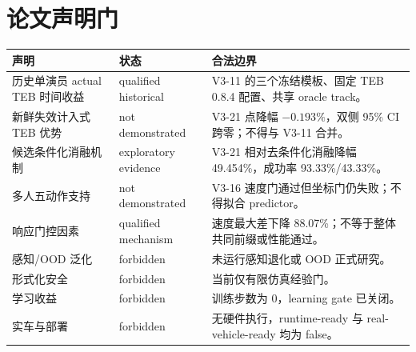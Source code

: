 \documentclass[12pt,a4paper,oneside]{report}
\begin{document}
\chapter{论文声明门}
\begin{longtable}{p{}p{}p{}}
\toprule
声明 & 状态 & 合法边界\\
\midrule
\endhead
历史单演员 actual TEB 时间收益 & qualified historical & V3-11 的三个冻结模板、固定 TEB 0.8.4 配置、共享 oracle track。\\
新鲜失效计入式 TEB 优势 & not demonstrated & V3-21 点降幅 $-0.193\%$，双侧 95\% CI 跨零；不得与 V3-11 合并。\\
候选条件化消融机制 & exploratory evidence & V3-21 相对去条件化消融降幅 49.454\%，成功率 93.33\%/43.33\%。\\
多人五动作支持 & not demonstrated & V3-16 速度门通过但坐标门仍失败；不得拟合 predictor。\\
响应门控因素 & qualified mechanism & 速度最大差下降 88.07\%；不等于整体共同前缀或性能通过。\\
感知/OOD 泛化 & forbidden & 未运行感知退化或 OOD 正式研究。\\
形式化安全 & forbidden & 当前仅有限仿真经验门。\\
学习收益 & forbidden & 训练步数为 0，learning gate 已关闭。\\
实车与部署 & forbidden & 无硬件执行，runtime-ready 与 real-vehicle-ready 均为 false。\\
\bottomrule
\end{longtable}
\end{document}
